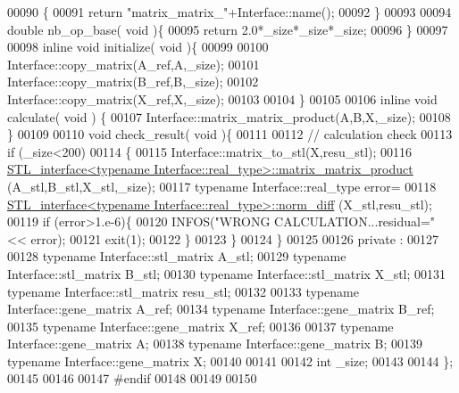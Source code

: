 \begin{DoxyCode}
00090   \{
00091     \textcolor{keywordflow}{return} \textcolor{stringliteral}{"matrix\_matrix\_"}+Interface::name();
00092   \}
00093 
00094   \textcolor{keywordtype}{double} nb\_op\_base( \textcolor{keywordtype}{void} )\{
00095     \textcolor{keywordflow}{return} 2.0*\_size*\_size*\_size;
00096   \}
00097 
00098   \textcolor{keyword}{inline} \textcolor{keywordtype}{void} initialize( \textcolor{keywordtype}{void} )\{
00099 
00100     Interface::copy\_matrix(A\_ref,A,\_size);
00101     Interface::copy\_matrix(B\_ref,B,\_size);
00102     Interface::copy\_matrix(X\_ref,X,\_size);
00103 
00104   \}
00105 
00106   \textcolor{keyword}{inline} \textcolor{keywordtype}{void} calculate( \textcolor{keywordtype}{void} ) \{
00107       Interface::matrix\_matrix\_product(A,B,X,\_size);
00108   \}
00109 
00110   \textcolor{keywordtype}{void} check\_result( \textcolor{keywordtype}{void} )\{
00111 
00112     \textcolor{comment}{// calculation check}
00113     \textcolor{keywordflow}{if} (\_size<200)
00114     \{
00115       Interface::matrix\_to\_stl(X,resu\_stl);
00116       \hyperlink{class_s_t_l__interface}{STL\_interface<typename Interface::real\_type>::matrix\_matrix\_product}
      (A\_stl,B\_stl,X\_stl,\_size);
00117       \textcolor{keyword}{typename} Interface::real\_type error=
00118         \hyperlink{class_s_t_l__interface}{STL\_interface<typename Interface::real\_type>::norm\_diff}
      (X\_stl,resu\_stl);
00119       \textcolor{keywordflow}{if} (error>1.e-6)\{
00120         INFOS(\textcolor{stringliteral}{"WRONG CALCULATION...residual="} << error);
00121         exit(1);
00122       \}
00123     \}
00124   \}
00125 
00126 private :
00127 
00128   \textcolor{keyword}{typename} Interface::stl\_matrix A\_stl;
00129   \textcolor{keyword}{typename} Interface::stl\_matrix B\_stl;
00130   \textcolor{keyword}{typename} Interface::stl\_matrix X\_stl;
00131   \textcolor{keyword}{typename} Interface::stl\_matrix resu\_stl;
00132 
00133   \textcolor{keyword}{typename} Interface::gene\_matrix A\_ref;
00134   \textcolor{keyword}{typename} Interface::gene\_matrix B\_ref;
00135   \textcolor{keyword}{typename} Interface::gene\_matrix X\_ref;
00136 
00137   \textcolor{keyword}{typename} Interface::gene\_matrix A;
00138   \textcolor{keyword}{typename} Interface::gene\_matrix B;
00139   \textcolor{keyword}{typename} Interface::gene\_matrix X;
00140 
00141 
00142   \textcolor{keywordtype}{int} \_size;
00143 
00144 \};
00145 
00146 
00147 \textcolor{preprocessor}{#endif}
00148 
00149 
00150 
\end{DoxyCode}
